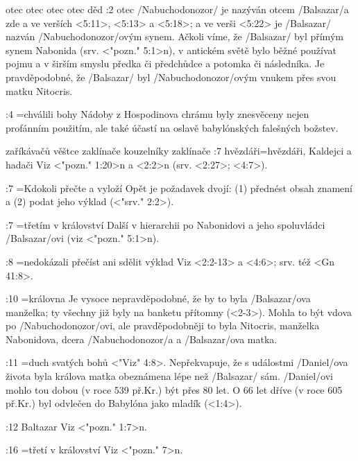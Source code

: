     {otec} %
    {otec}  %
    {otec} %
    {otec}  %
    {děd}  %
:2 {otec}  \x/Nabuchodonozor/ je nazýván otcem \x/Balsazar/a zde a ve verších 
<5:11>, <5:13> a <5:18>; a ve verši <5:22> je \x/Balsazar/ nazván \x/Nabuchodonozor/ovým synem.
Ačkoli víme, že \x/Balsazar/ byl přímým synem Nabonida  (srv. <"pozn." 5:1>n), v antickém světě bylo běžné používat pojmu  a  v širším smyslu předka či předchůdce a potomka či následníka. Je pravděpodobné, že \x/Balsazar/ byl \x/Nabuchodonozor/ovým vnukem přes svou matku Nitocris.
     
:4 {}={chválili bohy} Nádoby z Hospodinova chrámu byly znesvěceny nejen profánním použitím, ale také účastí na oslavě babylónských falešných božstev. 
     
    {zaříkávačů}   %
    {věštce}   %
    {zaklínače}   %
    {kouzelníky}   %
    {zaklínače}   %
:7 {hvězdáři}={hvězdáři, Kaldejci a hadači} Viz  <"pozn." 1:20>n a  <2:2>n (srv. <2:27>; <4:7>). 
     
:7 {}={Kdokoli přečte a vyloží} Opět je požadavek dvojí: (1) přednést obsah znamení a (2) podat jeho výklad  (<"srv." 2:2>).      
     
:7 {}={třetím v království} Další v hierarchii po Nabonidovi a jeho spoluvládci \x/Balsazar/ovi  (viz <"pozn." 5:1>n).     
     
:8 {}={nedokázali přečíst ani sdělit výklad} Viz  <2:2-13> a  <4:6>; srv. též <Gn 41:8>.   
 
:10 {}={královna} Je vysoce nepravděpodobné, že by to byla \x/Balsazar/ova manželka; ty všechny již byly na banketu přítomny  (<2-3>). Mohla to být vdova po \x/Nabuchodonozor/ovi, ale pravděpodobněji to byla  Nitocris, manželka Nabonidova, dcera \x/Nabuchodonozor/a a \x/Balsazar/ova matka.
     
:11 {}={duch svatých bohů}   <"Viz" 4:8>. 
Nepřekvapuje, že s událostmi \x/Daniel/ova života byla králova matka obeznámena lépe než  \x/Balsazar/ sám. \x/Daniel/ovi mohlo tou dobou (v roce 539 př.Kr.) být přes 80 let. O 66 let dříve (v roce 605 př.Kr.) byl odvlečen do Babylóna jako mladík (<1:4>).     
     
     
:12 {Baltazar} Viz <"pozn." 1:7>n.     
     
:16 {}={třetí v království} Viz  <"pozn." 7>n.     
     
